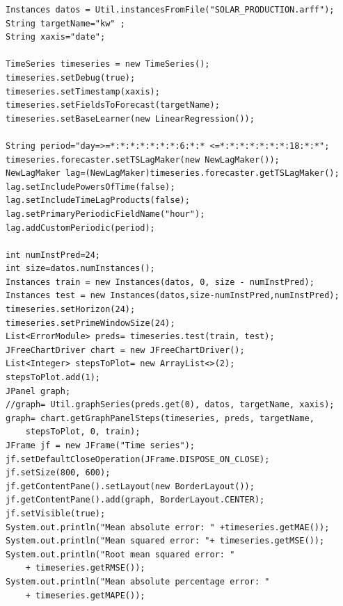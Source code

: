 \begin{lstlisting}[frame=single]  
Instances datos = Util.instancesFromFile("SOLAR_PRODUCTION.arff");
String targetName="kw" ;
String xaxis="date";

TimeSeries timeseries = new TimeSeries();
timeseries.setDebug(true);
timeseries.setTimestamp(xaxis);
timeseries.setFieldsToForecast(targetName);
timeseries.setBaseLearner(new LinearRegression());

String period="day=>=*:*:*:*:*:*:*:6:*:* <=*:*:*:*:*:*:*:18:*:*";
timeseries.forecaster.setTSLagMaker(new NewLagMaker());
NewLagMaker lag=(NewLagMaker)timeseries.forecaster.getTSLagMaker();
lag.setIncludePowersOfTime(false);
lag.setIncludeTimeLagProducts(false);
lag.setPrimaryPeriodicFieldName("hour"); 
lag.addCustomPeriodic(period);

int numInstPred=24;
int size=datos.numInstances();
Instances train = new Instances(datos, 0, size - numInstPred);
Instances test = new Instances(datos,size-numInstPred,numInstPred);
timeseries.setHorizon(24);
timeseries.setPrimeWindowSize(24);
List<ErrorModule> preds= timeseries.test(train, test);
JFreeChartDriver chart = new JFreeChartDriver();
List<Integer> stepsToPlot= new ArrayList<>(2);
stepsToPlot.add(1);
JPanel graph;
//graph= Util.graphSeries(preds.get(0), datos, targetName, xaxis);
graph= chart.getGraphPanelSteps(timeseries, preds, targetName,
	stepsToPlot, 0, train);
JFrame jf = new JFrame("Time series");
jf.setDefaultCloseOperation(JFrame.DISPOSE_ON_CLOSE);
jf.setSize(800, 600);
jf.getContentPane().setLayout(new BorderLayout());
jf.getContentPane().add(graph, BorderLayout.CENTER);
jf.setVisible(true);
System.out.println("Mean absolute error: " +timeseries.getMAE());
System.out.println("Mean squared error: "+ timeseries.getMSE());
System.out.println("Root mean squared error: "
	+ timeseries.getRMSE());
System.out.println("Mean absolute percentage error: " 
	+ timeseries.getMAPE());
\end{lstlisting}

